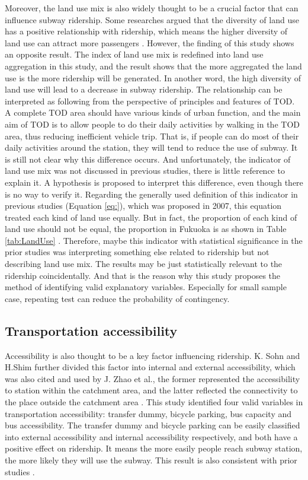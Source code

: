 \documentclass[utf8]{article}
\begin{document}
%
Moreover, the land use mix is also widely thought to be a crucial factor that can influence subway ridership. Some researches argued that the diversity of land use has a positive relationship with ridership, which means the higher diversity of land use can attract more passengers \cite{Gutierrez2011,Jun2015}. However, the finding of this study shows an opposite result. The index of land use mix is redefined into land use aggregation in this study, and the result shows that the more aggregated the land use is the more ridership will be generated. In another word, the high diversity of land use will lead to a decrease in subway ridership. The relationship can be interpreted as following from the perspective of principles and features of TOD. A complete TOD area should have various kinds of urban function, and the main aim of TOD is to allow people to do their daily activities by walking in the TOD area, thus reducing inefficient vehicle trip. That is, if people can do most of their daily activities around the station, they will tend to reduce the use of subway. It is still not clear why this difference occurs. And unfortunately, the indicator of land use mix was not discussed in previous studies, there is little reference to explain it. A hypothesis is proposed to interpret this difference, even though there is no way to verify it. Regarding the generally used definition of this indicator in previous studies (Equation \ref{eq:}), which was proposed in 2007, this equation treated each kind of land use equally. But in fact, the proportion of each kind of land use should not be equal, the proportion in Fukuoka is as shown in Table \ref{tab:LandUse} \cite{Bhat2007}. Therefore, maybe this indicator with statistical significance in the prior studies was interpreting something else related to ridership but not describing land use mix. The results may be just statistically relevant to the ridership coincidentally. And that is the reason why this study proposes the method of identifying valid explanatory variables. Especially for small sample case, repeating test can reduce the probability of contingency.

%
\subsection{Transportation accessibility}
\indent

Accessibility is also thought to be a key factor influencing ridership. K. Sohn and H.Shim further divided this factor into internal and external accessibility, which was also cited and used by J. Zhao et al., the former represented the accessibility to station within the catchment area, and the latter reflected the connectivity to the place outside the catchment area \cite{Sohn2010,Zhao2013}. This study identified four valid variables in transportation accessibility: transfer dummy, bicycle parking, bus capacity and bus accessibility. The transfer dummy and bicycle parking can be easily classified into external accessibility and internal accessibility respectively, and both have a positive effect on ridership. It means the more easily people reach subway station, the more likely they will use the subway. This result is also consistent with prior studies \cite{Gutierrez2011,Cardozo2012,Kuby2004}.
\end{document}
